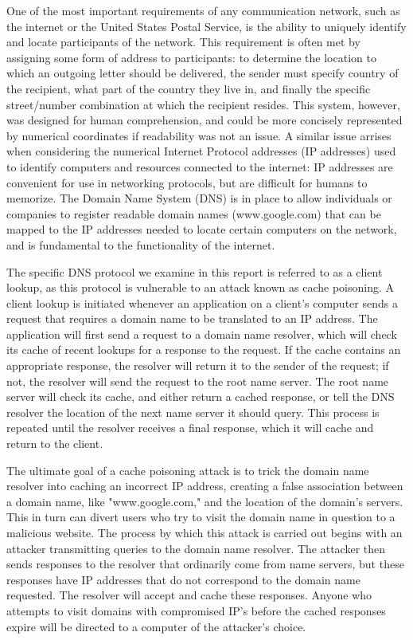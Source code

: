 \documentclass[a4paper, 12pt]{article} %
\begin{document}
One of the most important requirements of any communication network, such as the internet or the United States Postal Service, is the ability to uniquely identify and locate participants of the network. This requirement is often met by assigning some form of address to participants: to determine the location to which an outgoing letter should be delivered, the sender must specify country of the recipient, what part of the country they live in, and finally the specific street/number combination at which the recipient resides. This system, however, was designed for human comprehension, and could be more concisely represented by numerical coordinates if readability was not an issue. A similar issue arrises when considering the numerical Internet Protocol addresses (IP addresses) used to identify computers and resources connected to the internet: IP addresses are convenient for use in networking protocols, but are difficult for humans to memorize. The Domain Name System (DNS) is in place to allow individuals or companies to register readable domain names (www.google.com) that can be mapped to the IP addresses\cite{Schuba} needed to locate certain computers on the network, and is fundamental to the functionality of the internet.

The specific DNS protocol we examine in this report is referred to as a client lookup, as this protocol is vulnerable to an attack known as cache poisoning\cite{Son}. A client lookup is initiated whenever an application on a client's computer sends a request that requires a domain name to be translated to an IP address. The application will first send a request to a domain name resolver, which will check its cache of recent lookups for a response to the request. If the cache contains an appropriate response, the resolver will return it to the sender of the request; if not, the resolver will send the request to the root name server. The root name server will check its cache, and either return a cached response, or tell the DNS resolver the location of the next name server it should query\cite{Son}. This process is repeated until the resolver receives a final response, which it will cache and return to the client\cite{Racki}.

The ultimate goal of a cache poisoning attack is to trick the domain name resolver into caching an incorrect IP address, creating a false association between a domain name, like "www.google.com," and the location of the domain's servers. This in turn can divert users who try to visit the domain name in question to a malicious website. The process by which this attack is carried out begins with an attacker transmitting queries to the domain name resolver. The attacker then sends responses to the resolver that ordinarily come from name servers, but these responses have IP addresses that do not correspond to the domain name requested. The resolver will accept and cache these responses. Anyone who attempts to visit domains with compromised IP's before the cached responses expire will be directed to a computer of the attacker's choice. 
\end{document}
